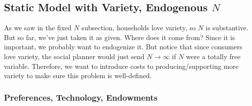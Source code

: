 \documentclass[12pt]{article}
\theoremstyle{plain}
\theoremstyle{definition}
\theoremstyle{remark}
\newcommand{\ra}{\rightarrow}
\begin{document}
\clearpage
\subsection{Static Model with Variety, Endogenous $N$}

As we saw in the fixed $N$ subsection, households love variety, so $N$
is substantive. But so far, we've just taken it as given. Where does it
come from? Since it is important, we probably want to endogenize it.
But notice that since consumers love variety, the social planner would
just send $N\ra \infty$ if $N$ were a totally free variable. Therefore,
we want to introduce costs to producing/supporting more variety to make
sure this problem is well-defined.

\subsubsection{Preferences, Technology, Endowments}
\end{document}
